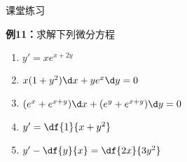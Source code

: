 
\begin{frame}{课堂练习}
	\linespread{1.5}
	\begin{exampleblock}{{\bf 例11：}求解下列微分方程\hfill}
		\begin{enumerate}
		  \item $y'=xe^{x+2y}$\pause 
		  \item $x(1+y^2)\d x+ye^x\d y=0$\pause 
		  \item $(e^x+e^{x+y})\d x+(e^y+e^{x+y})\d y=0$\pause 
		  \item $y'=\df{1}{x+y^2}$\pause 
		  \item $y'-\df{y}{x}=\df{2x}{3y^2}$
		\end{enumerate}
	\end{exampleblock}
\end{frame}

